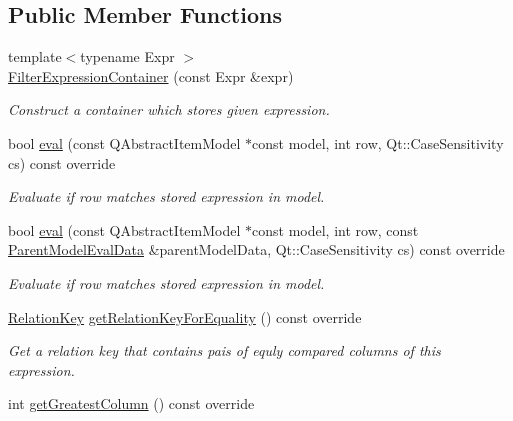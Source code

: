 \subsection*{Public Member Functions}
\begin{DoxyCompactItemize}
\item 
{\footnotesize template$<$typename Expr $>$ }\\\hyperlink{class_mdt_1_1_item_model_1_1_expression_1_1_filter_expression_container_a1a65ca5d3d6cd5a66e14322458c3ef8c}{Filter\+Expression\+Container} (const Expr \&expr)
\begin{DoxyCompactList}\small\item\em Construct a container which stores given expression. \end{DoxyCompactList}\item 
bool \hyperlink{class_mdt_1_1_item_model_1_1_expression_1_1_filter_expression_container_a5a9aef0b74b06dca38f681302d92a5e9}{eval} (const Q\+Abstract\+Item\+Model $\ast$const model, int row, Qt\+::\+Case\+Sensitivity cs) const override
\begin{DoxyCompactList}\small\item\em Evaluate if row matches stored expression in model. \end{DoxyCompactList}\item 
bool \hyperlink{class_mdt_1_1_item_model_1_1_expression_1_1_filter_expression_container_a918fdd7c8ae52da3e2bf78bde697d1d9}{eval} (const Q\+Abstract\+Item\+Model $\ast$const model, int row, const \hyperlink{class_mdt_1_1_item_model_1_1_expression_1_1_parent_model_eval_data}{Parent\+Model\+Eval\+Data} \&parent\+Model\+Data, Qt\+::\+Case\+Sensitivity cs) const override
\begin{DoxyCompactList}\small\item\em Evaluate if row matches stored expression in model. \end{DoxyCompactList}\item 
\hyperlink{class_mdt_1_1_item_model_1_1_relation_key}{Relation\+Key} \hyperlink{class_mdt_1_1_item_model_1_1_expression_1_1_filter_expression_container_a88f7ec4e3c1b173bf343b1757f4e6748}{get\+Relation\+Key\+For\+Equality} () const override\hypertarget{class_mdt_1_1_item_model_1_1_expression_1_1_filter_expression_container_a88f7ec4e3c1b173bf343b1757f4e6748}{}\label{class_mdt_1_1_item_model_1_1_expression_1_1_filter_expression_container_a88f7ec4e3c1b173bf343b1757f4e6748}

\begin{DoxyCompactList}\small\item\em Get a relation key that contains pais of equly compared columns of this expression. \end{DoxyCompactList}\item 
int \hyperlink{class_mdt_1_1_item_model_1_1_expression_1_1_filter_expression_container_a5b3998b5c91984d681353efb7e09107e}{get\+Greatest\+Column} () const override\hypertarget{class_mdt_1_1_item_model_1_1_expression_1_1_filter_expression_container_a5b3998b5c91984d681353efb7e09107e}{}\label{class_mdt_1_1_item_model_1_1_expression_1_1_filter_expression_container_a5b3998b5c91984d681353efb7e09107e}


\end{DoxyCompactItemize}
